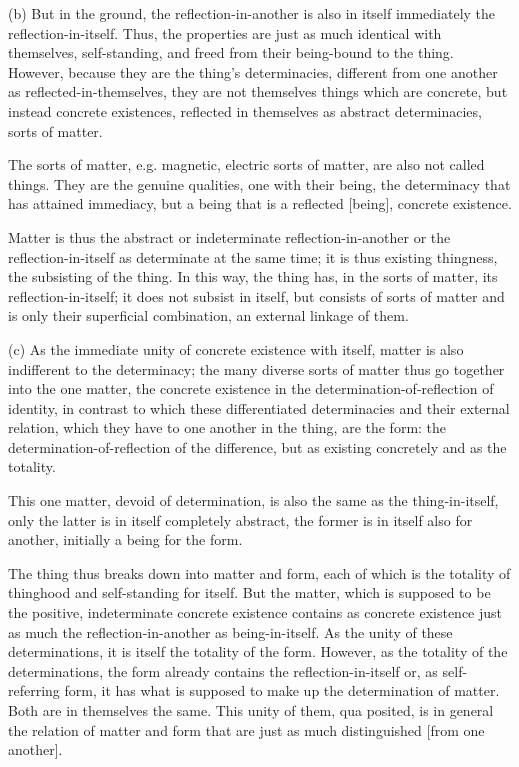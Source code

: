 (b) But in the ground, the reflection-in-another is also in itself immediately
the reflection-in-itself. Thus, the properties are just as much identical with
themselves, self-standing, and freed from their being-bound to the thing.
However, because they are the thing's determinacies, different from one
another as reflected-in-themselves, they are not themselves things which
are concrete, but instead concrete existences, reflected in themselves as
abstract determinacies, sorts of matter.

    The sorts of matter, e.g. magnetic, electric sorts of matter, are also
    not called things. They are the genuine qualities, one with their being,
    the determinacy that has attained immediacy,
    but a being that is a reflected [being], concrete existence.

Matter is thus the abstract or indeterminate reflection-in-another or
the reflection-in-itself as determinate at the same time;
it is thus existing thingness, the subsisting of the thing.
In this way, the thing has, in the sorts of matter,
its reflection-in-itself;
it does not subsist in itself, but consists of sorts of matter and
is only their superficial combination, an external linkage of them.

(c) As the immediate unity of concrete existence with itself,
matter is also indifferent to the determinacy;
the many diverse sorts of matter thus go together into
the one matter, the concrete existence in
the determination-of-reflection of identity,
in contrast to which these differentiated determinacies and
their external relation, which they have to one another in the thing,
are the form:
the determination-of-reflection of the difference,
but as existing concretely and as the totality.

    This one matter, devoid of determination, is also the same as
    the thing-in-itself, only the latter is in itself completely abstract,
    the former is in itself also for another, initially a being for the form.

The thing thus breaks down into matter and form,
each of which is the totality of thinghood and
self-standing for itself.
But the matter, which is supposed to be the positive,
indeterminate concrete existence contains as concrete existence
just as much the reflection-in-another as being-in-itself.
As the unity of these determinations,
it is itself the totality of the form.
However, as the totality of the determinations,
the form already contains the reflection-in-itself or,
as self-referring form, it has what is supposed to
make up the determination of matter.
Both are in themselves the same.
This unity of them, qua posited, is in general
the relation of matter and form that are
just as much distinguished [from one another].

